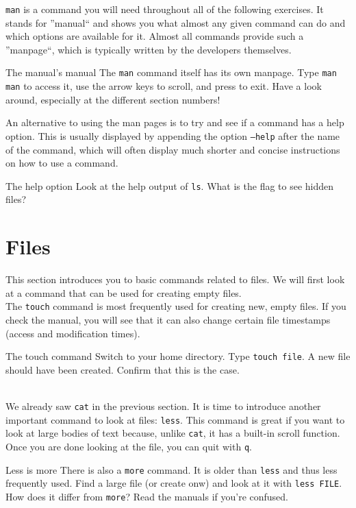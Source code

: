 \documentclass{TheAlternativeCourse}
\begin{document}
\texttt{man} is a command you will need throughout all of the following
exercises.  It stands for ''manual`` and shows you what almost any given
command can do and which options are available for it.  Almost all commands
provide such a ''manpage``, which is typically written by the developers
themselves. \\
%
\begin{exercisebox}{The manual's manual}
    The \texttt{man} command itself has its own manpage. Type \texttt{man man}
    to access it, use the arrow keys to scroll, and press  to exit.
    Have a look around, especially at the different section numbers!
\end{exercisebox}
%
An alternative to using the man pages is to try and see if a command has a help
option. This is usually displayed by appending the option \texttt{--help} after the
name of the command, which will often display much shorter and concise instructions
on how to use a command. \\
%
\begin{exercisebox}{The help option}
    Look at the help output of \texttt{ls}. What is the flag to see hidden files?
\end{exercisebox}

\section{Files}

This section introduces you to basic commands related to files. We will first look at a command that can be used for creating empty files.\\

The \texttt{touch} command is most frequently used for creating new, empty files. If you check the manual, you will see that it can also change certain file timestamps (access and modification times).\\
%
\begin{exercisebox}{The touch command}
	Switch to your home directory. Type \texttt{touch file}. A new file should have been created. Confirm that this is the case.
\end{exercisebox}\\
%
We already saw \texttt{cat} in the previous section. It is time to introduce another important command to look at files: \texttt{less}. This command is great if you want to look at large bodies of text because, unlike \texttt{cat}, it has a built-in scroll function. Once you are done looking at the file, you can quit with \texttt{q}.\\
%
\begin{exercisebox}{Less is more}
	There is also a \texttt{more} command. It is older than \texttt{less} and thus less frequently used. Find a large file (or create onw) and look at it with \texttt{less FILE}. How does it differ from \texttt{more}? Read the manuals if you're confused.
\end{exercisebox}
\end{document}
